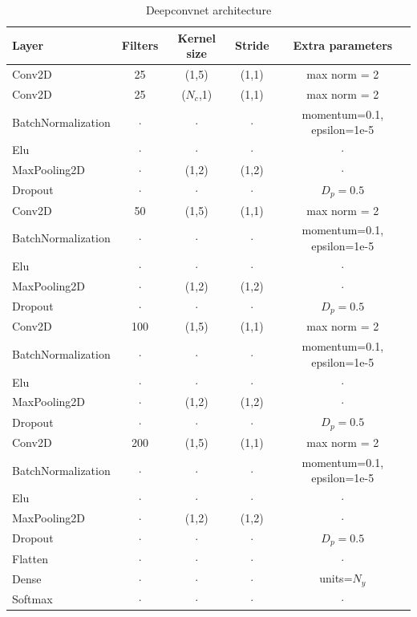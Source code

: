 \begin{table}[h!]
\caption{Deepconvnet architecture}\label{table:deepconvnet}
\centering
\begin{tabular}{l|c|c|c|c}
\hline
\textbf{Layer} & \textbf{Filters} & \textbf{Kernel size} & \textbf{Stride} & \textbf{Extra parameters}\\
\hline
Conv2D & 25 & (1,5) & (1,1)&max norm = 2 \\
Conv2D & 25 & ($N_c$,1) & (1,1)&max norm = 2 \\
BatchNormalization & $\cdot$ & $\cdot$ & $\cdot$ & momentum=0.1, epsilon=1e-5\\ 
Elu & $\cdot$ & $\cdot$ & $\cdot$ & $\cdot$\\
MaxPooling2D & $\cdot$ &(1,2) & (1,2)& $\cdot$\\
Dropout & $\cdot$ & $\cdot$ & $\cdot$ & $D_p = 0.5$\\
\hline
Conv2D & 50 & (1,5) & (1,1)&max norm = 2 \\
BatchNormalization & $\cdot$ & $\cdot$ & $\cdot$ & momentum=0.1, epsilon=1e-5\\ 
Elu & $\cdot$ & $\cdot$ & $\cdot$ & $\cdot$\\
MaxPooling2D & $\cdot$ &(1,2) & (1,2)& $\cdot$\\
Dropout & $\cdot$ & $\cdot$ & $\cdot$ & $D_p = 0.5$\\
\hline
Conv2D & 100 & (1,5) & (1,1)&max norm = 2 \\
BatchNormalization & $\cdot$ & $\cdot$ & $\cdot$ & momentum=0.1, epsilon=1e-5\\ 
Elu & $\cdot$ & $\cdot$ & $\cdot$ & $\cdot$\\
MaxPooling2D & $\cdot$ &(1,2) & (1,2)& $\cdot$\\
Dropout & $\cdot$ & $\cdot$ & $\cdot$ & $D_p = 0.5$\\
\hline
Conv2D & 200 & (1,5) & (1,1)&max norm = 2 \\
BatchNormalization & $\cdot$ & $\cdot$ & $\cdot$ & momentum=0.1, epsilon=1e-5\\ 
Elu & $\cdot$ & $\cdot$ & $\cdot$ & $\cdot$\\
MaxPooling2D & $\cdot$ &(1,2) & (1,2)& $\cdot$\\
Dropout & $\cdot$ & $\cdot$ & $\cdot$ & $D_p = 0.5$\\
\hline
Flatten & $\cdot$ & $\cdot$ & $\cdot$ & $\cdot$\\
Dense & $\cdot$ & $\cdot$ & $\cdot$ & units=$N_y$\\
Softmax & $\cdot$ & $\cdot$ & $\cdot$ & $\cdot$\\
\hline
\end{tabular}
\end{table}

